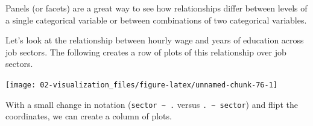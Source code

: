 \documentclass[
]{book}
\newenvironment{Shaded}{\begin{snugshade}}{\end{snugshade}}
\newcommand{\DataTypeTok}[1]{\textcolor[rgb]{0.13,0.29,0.53}{#1}}
\newcommand{\DecValTok}[1]{\textcolor[rgb]{0.00,0.00,0.81}{#1}}
\newcommand{\KeywordTok}[1]{\textcolor[rgb]{0.13,0.29,0.53}{\textbf{#1}}}
\newcommand{\NormalTok}[1]{#1}
\newcommand{\OperatorTok}[1]{\textcolor[rgb]{0.81,0.36,0.00}{\textbf{#1}}}
\newcommand{\StringTok}[1]{\textcolor[rgb]{0.31,0.60,0.02}{#1}}
\begin{document}
Panels (or facets) are a great way to see how relationships differ between levels of a single categorical variable or between combinations of two categorical variables.

Let's look at the relationship between hourly wage and years of education across job sectors. The following creates a row of plots of this relationship over job sectors.

\begin{Shaded}
\end{Shaded}

\begin{center}\texttt{[image: 02-visualization\_files/figure-latex/unnamed-chunk-76-1]} \end{center}

With a small change in notation (\texttt{sector\ \textasciitilde{}\ .} versus \texttt{.\ \textasciitilde{}\ sector}) and flipt the coordinates, we can create a column of plots.

\begin{Shaded}
\end{Shaded}
\end{document}
